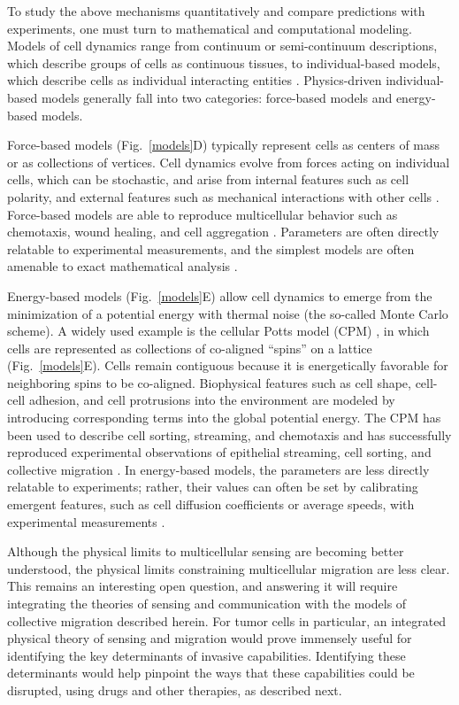To study the above mechanisms quantitatively and compare predictions with experiments, one must turn to mathematical and computational modeling. Models of cell dynamics range from continuum or semi-continuum descriptions, which describe groups of cells as continuous tissues, to individual-based models, which describe cells as individual interacting entities \cite{maclaren2015models}. Physics-driven individual-based models generally fall into two categories: force-based models and energy-based models.

Force-based models (Fig.\ \ref{models}D) typically represent cells as centers of mass or as collections of vertices. Cell dynamics evolve from forces acting on individual cells, which can be stochastic, and arise from internal features such as cell polarity, and external features such as mechanical interactions with other cells \cite{maclaren2015models}. Force-based models are able to reproduce multicellular behavior such as chemotaxis, wound healing, and cell aggregation \cite{camley2016emergent,basan2013alignment,janulevicius2015short}. Parameters are often directly relatable to experimental measurements, and the simplest models are often amenable to exact mathematical analysis \cite{camley2016emergent}.

Energy-based models (Fig.\ \ref{models}E) allow cell dynamics to emerge from the minimization of a potential energy with thermal noise (the so-called Monte Carlo scheme). A widely used example is the cellular Potts model (CPM) \cite{graner1992simulation, swat2012multi}, in which cells are represented as collections of co-aligned ``spins'' on a lattice (Fig.\ \ref{models}E). Cells remain contiguous because it is energetically favorable for neighboring spins to be co-aligned. Biophysical features such as cell shape, cell-cell adhesion, and cell protrusions into the environment are modeled by introducing corresponding terms into the global potential energy. The CPM has been used to describe cell sorting, streaming, and chemotaxis \cite{maree2007cellular} and has successfully reproduced experimental observations of epithelial streaming, cell sorting, and collective migration \cite{kabla2012collective,maree2007cellular,szabo2010collective}. In energy-based models, the parameters are less directly relatable to experiments; rather, their values can often be set by calibrating emergent features, such as cell diffusion coefficients or average speeds, with experimental measurements \cite{szabo2010collective}.

Although the physical limits to multicellular sensing are becoming better understood, the physical limits constraining multicellular migration are less clear. This remains an interesting open question, and answering it will require integrating the theories of sensing and communication with the models of collective migration described herein. For tumor cells in particular, an integrated physical theory of sensing and migration would prove immensely useful for identifying the key determinants of invasive capabilities. Identifying these determinants would help pinpoint the ways that these capabilities could be disrupted, using drugs and other therapies, as described next.

